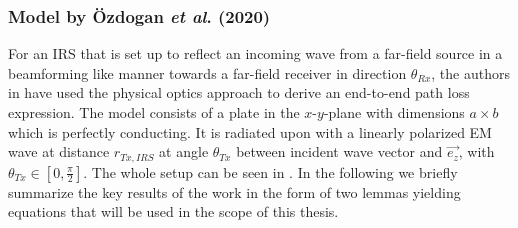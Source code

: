 \subsubsection{Model by Özdogan \emph{et al}. (2020) \cite{8936989}} \label{Model 1}
For an \ac{IRS} that is set up to reflect an incoming wave from a far-field source in a beamforming like manner towards a far-field receiver in direction $\theta_{Rx}$, the authors in \cite{8936989} have used the physical optics approach to derive an end-to-end path loss expression. The model consists of a plate in the $x$-$y$-plane with dimensions $a \times b$ which is perfectly conducting. It is radiated upon with a linearly polarized EM wave at distance $r_{Tx, IRS}$ at angle $\theta_{Tx}$ between incident wave vector and $\overrightarrow{e_z}$, with $\theta_{Tx} \in [0, \frac{\pi}{2}] $. The whole setup can be seen in  . In the following we briefly summarize the key results of the work in the form of two lemmas yielding equations that will be used in the scope of this thesis.

